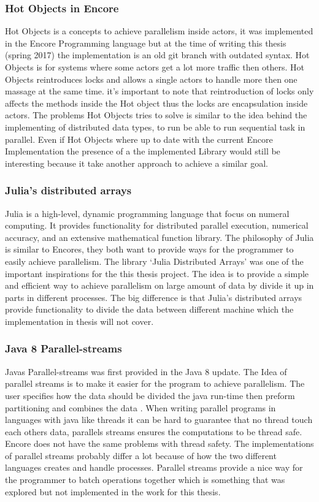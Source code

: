 \subsubsection{Hot Objects in Encore}
Hot Objects is a concepts to achieve parallelism inside actors, it was implemented in the Encore Programming language but at the time of writing this thesis (spring 2017) the implementation is an old git branch with outdated syntax. Hot Objects is for systems where some actors get a lot more traffic then others. Hot Objects reintroduces locks and allows a single actors to handle more then one massage at the same time. it's important to note that reintroduction of locks only affects the methods inside the Hot object thus the locks are encapsulation inside actors\cite{Hotobjects}. The problems Hot Objects tries to solve is similar to the idea behind the implementing of distributed data types, to run be able to run sequential task in parallel. Even if Hot Objects where up to date with the current Encore Implementation the presence of a the implemented Library would still be interesting because it take another approach to achieve a similar goal.

\subsubsection{Julia's distributed arrays}
Julia is a high-level, dynamic programming language that focus on numeral computing. It provides functionality for distributed parallel execution, numerical accuracy, and an extensive mathematical function library\cite{julia}. The philosophy of Julia is similar to Encores, they both want to provide ways for the programmer to easily achieve parallelism. The library ‘Julia Distributed Arrays’\cite{distarrays} was one of the important inspirations for the this thesis project. The idea is to provide a simple and efficient way to achieve parallelism on large amount of data by divide it up in parts in different processes. The big difference is that Julia’s distributed arrays provide functionality to divide the data between different machine which the implementation in thesis will not cover.

\subsubsection{Java 8 Parallel-streams}
Javas Parallel-streams was first provided in the Java 8 update. The Idea of parallel streams is to make it easier for the program to achieve parallelism. The user specifies how the data should be divided the java run-time then preform partitioning and combines the data \cite{pstreams}. When writing parallel programs in languages with java like threads it can be hard to guarantee that no thread touch each others data, parallels streams ensures the computations to be thread safe. Encore does not have the same problems with thread safety. The implementations of parallel streams probably differ a lot because of how the two different languages creates and handle processes. Parallel streams provide a nice way for the programmer to batch operations together which is something that was explored but not implemented in the work for this thesis.

